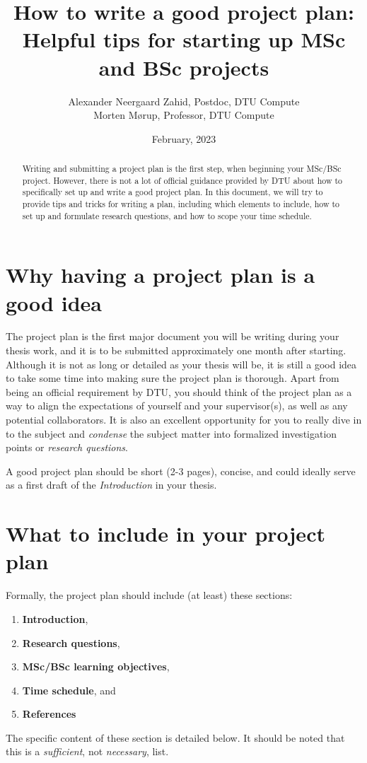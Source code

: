 \documentclass{article}
\title{How to write a good project plan:\\%
       Helpful tips for starting up MSc and BSc projects}
\author{Alexander Neergaard Zahid, Postdoc, DTU Compute\\%
        Morten Mørup, Professor, DTU Compute}
\date{February, 2023}
\begin{document}
\maketitle

\begin{abstract}
    Writing and submitting a project plan is the first step, when beginning your MSc/BSc project. 
    However, there is not a lot of official guidance provided by DTU about how to specifically set up and write a good project plan.
    In this document, we will try to provide tips and tricks for writing a plan, including which elements to include, how to set up and formulate research questions, and how to scope your time schedule.
\end{abstract}

\section{Why having a project plan is a good idea}
The project plan is the first major document you will be writing during your thesis work, and it is to be submitted approximately one month after starting. 
Although it is not as long or detailed as your thesis will be, it is still a good idea to take some time into making sure the project plan is thorough.
Apart from being an official requirement by DTU, you should think of the project plan as a way to align the expectations of yourself and your supervisor(s), as well as any potential collaborators.
It is also an excellent opportunity for you to really dive in to the subject and \emph{condense} the subject matter into formalized investigation points or \emph{research questions}.

A good project plan should be short (2-3 pages), concise, and could ideally serve as a first draft of the \emph{Introduction} in your thesis.

\section{What to include in your project plan}
Formally, the project plan should include (at least) these sections:
\begin{enumerate}
    \item \textbf{Introduction},
    \item \textbf{Research questions},
    \item \textbf{MSc/BSc learning objectives},
    \item \textbf{Time schedule}, and
    \item \textbf{References}
\end{enumerate}
The specific content of these section is detailed below.
It should be noted that this is a \textit{sufficient}, not \textit{necessary}, list.
\end{document}
